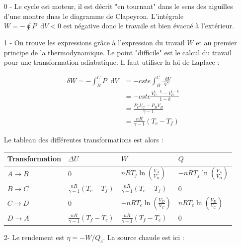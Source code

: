 \documentclass{report}
\newcommand*\dif{\mathop{}\!\mathrm{d}}
\begin{document}
\begin{itemize}

	\item[0 -] Le cycle est moteur, il est décrit "en tournant" dans le sens des aiguilles d'une montre dnas le diagramme de Clapeyron. L'intégrale $W=-\oint P\dif V<0$ est négative donc le travaile st bien évacué à l'extérieur.

	\item[1 -] On trouve les expressions grâce à l'expression du travail $W$ et au premier principe de la thermodynamique. Le point "difficile" est le calcul du travail pour une transformation adiabatique. Il faut utiliser la loi de Laplace : 

\begin{align*}
	\delta W = -\int_B^C P\dif V &= -cste\int_B^C \frac{\dif V}{V^{\gamma}}\\
	&=-cste\frac{V_C^{1-k}-V_B^{1-k}}{1-k}\\
	&=\frac{P_CV_C-P_BV_B}{\gamma-1}\\
	&= \frac{nR}{\gamma-1}(T_c-T_f)
\end{align*}

Le tableau des différentes transformations est alors :

\begin{center}
\begin{tabular}{|p{}|p{3cm}|p{3cm}|p{3cm}|}
\hline
Transformation & $\Delta U$ & $W$ & $Q$ \\
\hline
$A\rightarrow B$ & 0  & $nRT_f\ln\left(\frac{V_A}{V_B} \right)$  & $-nRT_f\ln\left(\frac{V_A}{V_B} \right)$  \\
\hline
$B\rightarrow C$ & $\frac{nR}{\gamma-1}(T_c-T_f)$ & $\frac{nR}{\gamma-1}(T_c-T_f)$ & 0  \\
\hline
$C\rightarrow D$ & 0  & $-nRT_c\ln\left(\frac{V_D}{V_C} \right)$  & $ nRT_c\ln\left(\frac{V_D}{V_C} \right)$ \\
\hline
$D\rightarrow A$ & $\frac{nR}{\gamma-1}(T_f-T_c)$ & $\frac{nR}{\gamma-1}(T_f-T_c)$ & 0 \\
\hline
\end{tabular}
\end{center}

\item[2-]  Le rendement est $\eta=-W/Q_c$. La source chaude est ici :


\end{itemize}
\end{document}
